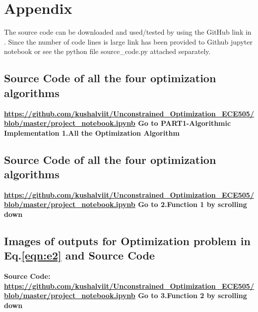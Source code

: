 \documentclass[paper=a4, fontsize=11pt]{scrartcl}
\numberwithin{equation}{section}		%
\numberwithin{figure}{section}			%
\numberwithin{table}{section}				%
\begin{document}
\section*{Appendix}
The source code can be downloaded and used/tested by using the GitHub link in \cite{last}.
Since the number of code lines is large link has been provided to Github jupyter notebook or see the python file source\_code.py attached separately.
\subsection*{Source Code of all the four optimization algorithms}
\textbf{\url{https://github.com/kushalviit/Unconstrained_Optimization_ECE505/blob/master/project_notebook.ipynb}
Go to PART1-Algorithmic Implementation 1.All the Optimization Algorithm}
\subsection*{Source Code of all the four optimization algorithms}
\textbf{\url{https://github.com/kushalviit/Unconstrained_Optimization_ECE505/blob/master/project_notebook.ipynb}
Go to 2.Function 1 by scrolling down}
\subsection*{Images of outputs for Optimization problem in Eq.\ref{eqn:e2} and Source Code}
\textbf{Source Code: \url{https://github.com/kushalviit/Unconstrained_Optimization_ECE505/blob/master/project_notebook.ipynb}
Go to 3.Function 2 by scrolling down}
\end{document}
